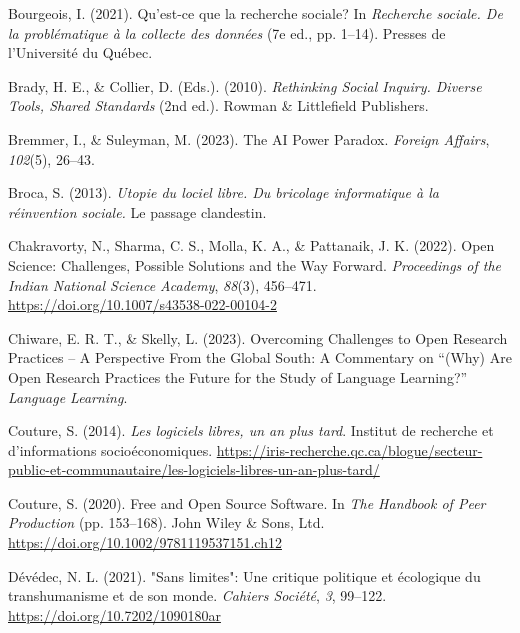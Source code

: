 \documentclass[
  letterpaper,
  DIV=11,
  numbers=noendperiod]{scrreprt}
\newlength{\cslhangindent}
\newlength{\cslentryspacingunit} %
\newenvironment{CSLReferences}[2] %
 {%
  \setlength{\parindent}{0pt}
  \ifodd #1
  \let\oldpar\par
  \def\par{\hangindent=\cslhangindent\oldpar}
  \fi
  \setlength{\parskip}{#2\cslentryspacingunit}
 }%
 {}
\begin{document}
\begin{CSLReferences}{1}{0}
\leavevmode{}%
Bourgeois, I. (2021). Qu'est-ce que la recherche sociale? In
\emph{Recherche sociale. {De} la problématique à la collecte des
données} (7e ed., pp. 1--14). Presses de l'Université du Québec.

\leavevmode{}%
Brady, H. E., \& Collier, D. (Eds.). (2010). \emph{Rethinking {Social
Inquiry}. {Diverse Tools}, {Shared Standards}} (2nd ed.). Rowman \&
Littlefield Publishers.

\leavevmode{}%
Bremmer, I., \& Suleyman, M. (2023). The {AI Power Paradox}.
\emph{Foreign Affairs}, \emph{102}(5), 26--43.

\leavevmode{}%
Broca, S. (2013). \emph{Utopie du lociel libre. {Du} bricolage
informatique à la réinvention sociale.} Le passage clandestin.

\leavevmode{}%
Chakravorty, N., Sharma, C. S., Molla, K. A., \& Pattanaik, J. K.
(2022). Open {Science}: {Challenges}, {Possible Solutions} and the {Way
Forward}. \emph{Proceedings of the Indian National Science Academy},
\emph{88}(3), 456--471. \url{https://doi.org/10.1007/s43538-022-00104-2}

\leavevmode{}%
Chiware, E. R. T., \& Skelly, L. (2023). Overcoming {Challenges} to
{Open Research Practices} -- {A Perspective From} the {Global South}: {A
Commentary} on {``({Why}) {Are Open Research Practices} the {Future} for
the {Study} of {Language Learning}?''} \emph{Language Learning}.

\leavevmode{}%
Couture, S. (2014). \emph{Les logiciels libres, un an plus tard}.
Institut de recherche et d'informations socioéconomiques.
\url{https://iris-recherche.qc.ca/blogue/secteur-public-et-communautaire/les-logiciels-libres-un-an-plus-tard/}

\leavevmode{}%
Couture, S. (2020). Free and {Open Source Software}. In \emph{The
{Handbook} of {Peer Production}} (pp. 153--168). John Wiley \& Sons,
Ltd. \url{https://doi.org/10.1002/9781119537151.ch12}

\leavevmode{}%
Dévédec, N. L. (2021). "{Sans} limites": Une critique politique et
écologique du transhumanisme et de son monde. \emph{Cahiers Société},
\emph{3}, 99--122. \url{https://doi.org/10.7202/1090180ar}


\end{CSLReferences}
\end{document}
